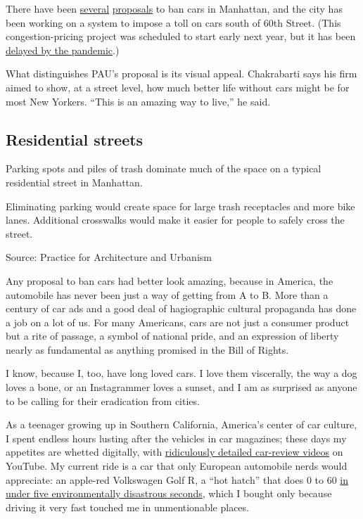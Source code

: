 There have been
\href{https://www.dissentmagazine.org/article/banning-cars-from-manhattan}{several}
\href{https://ny.curbed.com/2019/10/3/20896837/nyc-traffic-history-pedestrian-cars}{proposals}
to ban cars in Manhattan, and the city has been working on a system to
impose a toll on cars south of 60th Street. (This congestion-pricing
project was scheduled to start early next year, but it has been
\href{https://www.nydailynews.com/coronavirus/ny-coronavirus-congestion-pricing-on-hold-20200422-idyclofw4nbnnbc3ftbhjpjfpm-story.html}{delayed
by the pandemic}.)

What distinguishes PAU's proposal is its visual appeal. Chakrabarti says
his firm aimed to show, at a street level, how much better life without
cars might be for most New Yorkers. ``This is an amazing way to live,''
he said.

\hypertarget{residential-streets}{%
\subsection{Residential streets}\label{residential-streets}}

Parking spots and piles of trash dominate much of the space on a typical
residential street in Manhattan.

Eliminating parking would create space for large trash receptacles and
more bike lanes. Additional crosswalks would make it easier for people
to safely cross the street.

Source: Practice for Architecture and Urbanism

Any proposal to ban cars had better look amazing, because in America,
the automobile has never been just a way of getting from A to B. More
than a century of car ads and a good deal of hagiographic cultural
propaganda has done a job on a lot of us. For many Americans, cars are
not just a consumer product but a rite of passage, a symbol of national
pride, and an expression of liberty nearly as fundamental as anything
promised in the Bill of Rights.

I know, because I, too, have long loved cars. I love them viscerally,
the way a dog loves a bone, or an Instagrammer loves a sunset, and I am
as surprised as anyone to be calling for their eradication from cities.

As a teenager growing up in Southern California, America's center of car
culture, I spent endless hours lusting after the vehicles in car
magazines; these days my appetites are whetted digitally, with
\href{https://www.youtube.com/channel/UCsqjHFMB_JYTaEnf_vmTNqg}{ridiculously
detailed car-review videos} on YouTube. My current ride is a car that
only European automobile nerds would appreciate: an apple-red Volkswagen
Golf R, a ``hot hatch'' that does 0 to 60
\href{https://youtu.be/meSVfbFEwH8}{in under five environmentally
disastrous seconds}, which I bought only because driving it very fast
touched me in unmentionable places.

